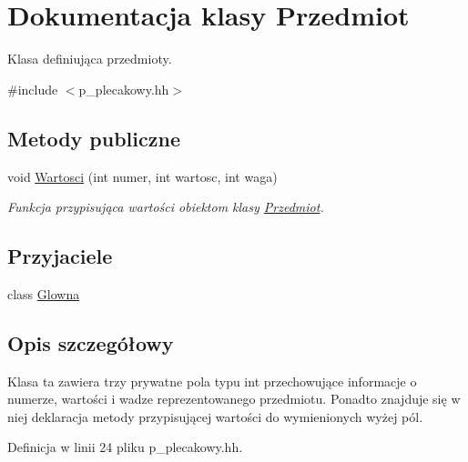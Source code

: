 \hypertarget{class_przedmiot}{\section{\-Dokumentacja klasy \-Przedmiot}
\label{class_przedmiot}
}


\-Klasa definiująca przedmioty.  




{\ttfamily \#include $<$p\-\_\-plecakowy.\-hh$>$}

\subsection*{\-Metody publiczne}
\begin{DoxyCompactItemize}
\item 
void \hyperlink{class_przedmiot_a72bb08f410dd64bcf3ea5c9aa24683e4}{\-Wartosci} (int numer, int wartosc, int waga)
\begin{DoxyCompactList}\small\item\em \-Funkcja przypisująca wartości obiektom klasy \hyperlink{class_przedmiot}{\-Przedmiot}. \end{DoxyCompactList}\end{DoxyCompactItemize}
\subsection*{\-Przyjaciele}
\begin{DoxyCompactItemize}
\item 
class \hyperlink{class_przedmiot_af5e32df0a3534c50807b1860fd973d52}{\-Glowna}
\end{DoxyCompactItemize}


\subsection{\-Opis szczegółowy}
\-Klasa ta zawiera trzy prywatne pola typu int przechowujące informacje o numerze, wartości i wadze reprezentowanego przedmiotu. \-Ponadto znajduje się w niej deklaracja metody przypisującej wartości do wymienionych wyżej pól. 

\-Definicja w linii 24 pliku p\-\_\-plecakowy.\-hh.



